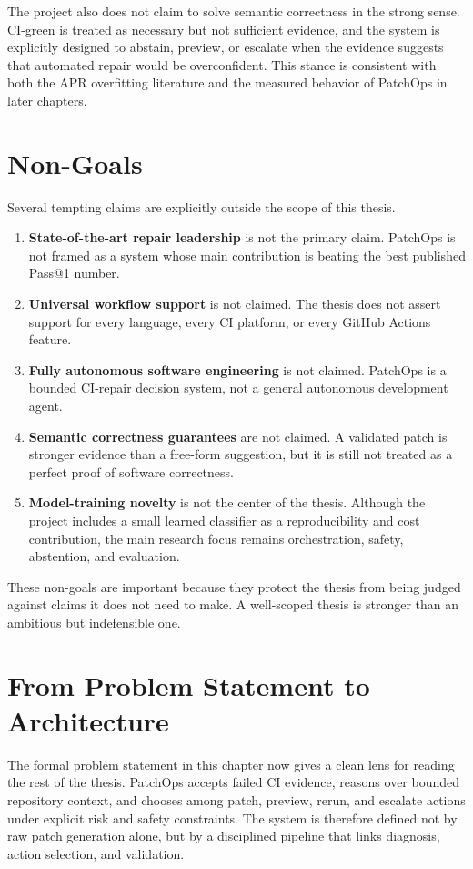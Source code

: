 The project also does not claim to solve semantic correctness in the strong sense. CI-green is treated as
necessary but not sufficient evidence, and the system is explicitly designed to abstain, preview, or escalate
when the evidence suggests that automated repair would be overconfident. This stance is consistent with both the
APR overfitting literature and the measured behavior of PatchOps in later chapters.

\section{Non-Goals}

Several tempting claims are explicitly outside the scope of this thesis.

\begin{enumerate}
\item \textbf{State-of-the-art repair leadership} is not the primary claim. PatchOps is not framed as a system
whose main contribution is beating the best published Pass@1 number.
\item \textbf{Universal workflow support} is not claimed. The thesis does not assert support for every language,
every CI platform, or every GitHub Actions feature.
\item \textbf{Fully autonomous software engineering} is not claimed. PatchOps is a bounded CI-repair decision
system, not a general autonomous development agent.
\item \textbf{Semantic correctness guarantees} are not claimed. A validated patch is stronger evidence than a
free-form suggestion, but it is still not treated as a perfect proof of software correctness.
\item \textbf{Model-training novelty} is not the center of the thesis. Although the project includes a small
learned classifier as a reproducibility and cost contribution, the main research focus remains orchestration,
safety, abstention, and evaluation.
\end{enumerate}

These non-goals are important because they protect the thesis from being judged against claims it does not need
to make. A well-scoped thesis is stronger than an ambitious but indefensible one.

\section{From Problem Statement to Architecture}

The formal problem statement in this chapter now gives a clean lens for reading the rest of the thesis. PatchOps
accepts failed CI evidence, reasons over bounded repository context, and chooses among patch, preview, rerun,
and escalate actions under explicit risk and safety constraints. The system is therefore defined not by raw
patch generation alone, but by a disciplined pipeline that links diagnosis, action selection, and validation.

